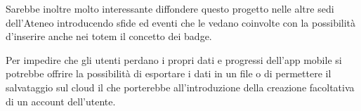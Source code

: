 Sarebbe inoltre molto interessante diffondere questo progetto nelle altre sedi dell'Ateneo introducendo sfide ed eventi che le vedano coinvolte con la possibilità d'inserire anche nei totem il concetto dei badge.

Per impedire che gli utenti perdano i propri dati e progressi dell'app mobile si potrebbe offrire la possibilità di esportare i dati in un file o di permettere il salvataggio sul cloud il che porterebbe all'introduzione della creazione facoltativa di un account dell'utente.

